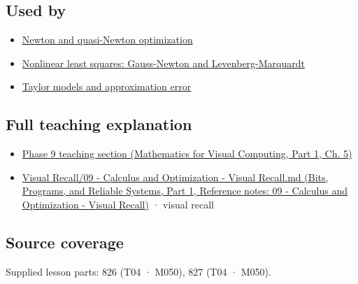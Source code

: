 \subsection{Used by}\label{appendix-6ac071f8b50c-used-by}

\hypertarget{appendix-6ac071f8b50c-used-by}{}

\begin{itemize}
\tightlist
\item
  \hyperref[appendix-54c8f5828387]{Newton and quasi-Newton optimization}
\item
  \hyperref[appendix-2c2df8345991]{Nonlinear least squares: Gauss-Newton and Levenberg-Marquardt}
\item
  \hyperref[appendix-32f39e9a3738]{Taylor models and approximation error}
\end{itemize}

\subsection{Full teaching explanation}\label{appendix-6ac071f8b50c-full-teaching-explanation}

\hypertarget{appendix-6ac071f8b50c-full-teaching-explanation}{}

\begin{itemize}
\tightlist
\item
  \href{../02-Mathematics-for-Visual-Computing-P01/main.pdf\#nameddest=02-foundations-ii-ch021-jacobians-curvature-and-local-approximation}{Phase 9 teaching section (Mathematics for Visual Computing, Part 1, Ch. 5)}
\item
  \href{../01-Bits-Programs-and-Reliable-Systems-P01/main.pdf\#nameddest=appendix-adf48f5dc5c1}{Visual Recall/09 - Calculus and Optimization - Visual Recall.md (Bits, Programs, and Reliable Systems, Part 1, Reference notes: 09 - Calculus and Optimization - Visual Recall)} · visual recall
\end{itemize}

\subsection{Source coverage}\label{appendix-6ac071f8b50c-source-coverage}

\hypertarget{appendix-6ac071f8b50c-source-coverage}{}

Supplied lesson parts: 826 (T04 · M050), 827 (T04 · M050).
